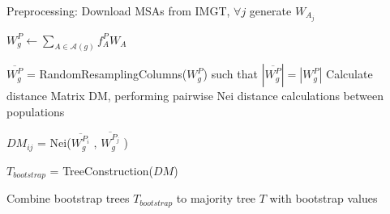 \begin{algorithm}
    Preprocessing: Download MSAs from IMGT, $\forall j$ generate $W_{A_j}$

     {
         {
            $W^{P}_g \leftarrow \sum_{A\in\mathcal{A}(g)} f_A^{P} W_{A}$
        }
    }
     {
         {
           $\overline{W^P_g}$ = RandomResamplingColumns($W^P_g$) such that $|\overline{W^P_g}| = |W^P_{g}|$
        }
        Calculate distance Matrix DM, performing pairwise Nei distance calculations between populations

         {
             {
                $DM_{ij}$ = Nei($\overline{W^{P_i}_g}$ , $\overline{W^{P_j}_g}$ )
            }
        }

        $T_{\mathit{bootstrap}}$ = TreeConstruction($DM$)
    }
    Combine bootstrap trees $T_{\mathit{bootstrap}}$ to majority tree $T$ with bootstrap values

\end{algorithm}


